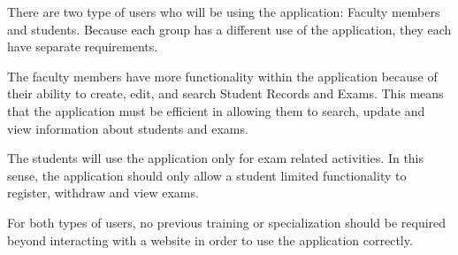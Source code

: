 
There are two type of users  who will be using the application:
Faculty members and students. Because each group has a different use of the
application, they each have separate requirements. 

The faculty members have more functionality within the application because of
their ability to create, edit, and search Student Records and Exams. This means
that the application must be efficient in allowing them to search, update and
view information about students and exams.

The students will use the application only for exam related activities. In this
sense, the application should only allow a student limited functionality to
register, withdraw and view exams.

For both types of users, no previous training  or specialization should be
required beyond interacting with a website in order to use the application
correctly.

